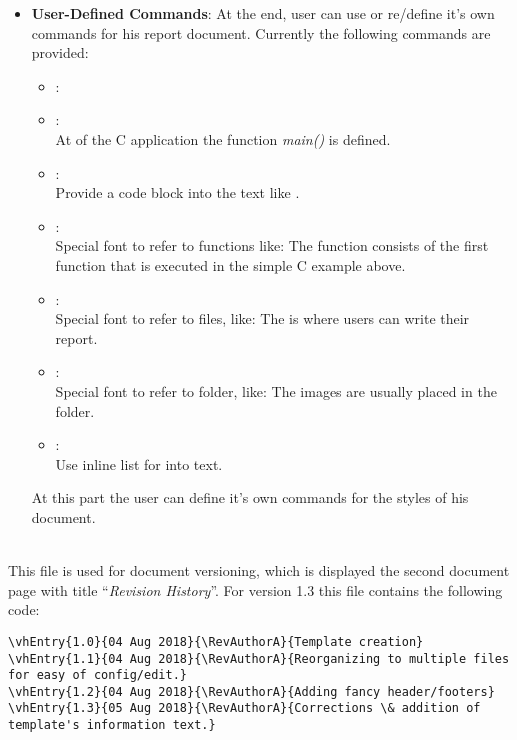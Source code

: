 \begin{description}
\begin{itemize}
\begin{lstlisting}
int main(int argc, char** argv) {
	printf("Hello World!\n");
	return 0;
}
\end{lstlisting}
\item{\textbf{User-Defined Commands}}: At the end, user can use or re/define it's own commands for his report document. Currently the following commands are provided:
\begin{itemize}
\item{\codemr{\\rednote\{\}}:\\ }
\item{\codemr{\\codeline\{\}}:\\ At  of the C application the function \textit{main()} is defined.}
\item{\codemr{\\codemr\{\}}:\\ Provide a code block into the text like }.
\item{\codemr{\\functionname\{\}}:\\ Special font to refer to functions like: The function  consists of the first function that is executed in the simple C example above.}
\item{\codemr{\\filename\{\}}:\\ Special font to refer to files, like: The  is where users can write their report.}
\item{\codemr{\\foldername\{\}}:\\ Special font to refer to folder, like: The images are usually placed in the  folder.}
\item{\codemr{\\tvar\{\}}:\\ Use inline list for  into text.}
\end{itemize}
At this part the user can define it's own commands for the styles of his document.
\end{itemize}



\item{\textbf{}} \hfill \\
This file is used for document versioning, which is displayed the second document page with title ``\textit{Revision History}''. For version 1.3 this file contains the following code:
\lstset{language=TeX}
\begin{lstlisting}
\vhEntry{1.0}{04 Aug 2018}{\RevAuthorA}{Template creation}
\vhEntry{1.1}{04 Aug 2018}{\RevAuthorA}{Reorganizing to multiple files for easy of config/edit.}
\vhEntry{1.2}{04 Aug 2018}{\RevAuthorA}{Adding fancy header/footers}
\vhEntry{1.3}{05 Aug 2018}{\RevAuthorA}{Corrections \& addition of template's information text.}
\end{lstlisting}




\end{description}
